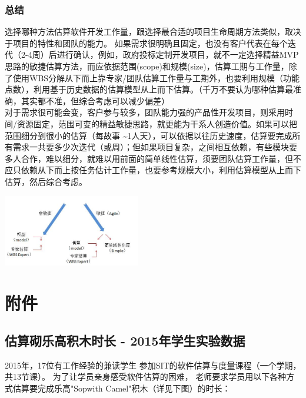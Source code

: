 \hypertarget{ux603bux7ed3}{%
\subsubsection{总结}\label{ux603bux7ed3}}

选择哪种方法估算软件开发工作量，跟选择最合适的项目生命周期方法类似，取决于项目的特性和团队的能力。 如果需求很明确且固定，也没有客户代表在每个迭代（2-4周）后进行确认，例如，政府投标定制开发项目，就不一定选择精益MVP思路的敏捷估算方法，而应依据范围(scope)和规模(size)，估算工期与工作量，除了使用WBS分解从下而上靠专家/团队估算工作量与工期外，也要利用规模（功能点数），利用基于历史数据的估算模型从上而下估算。（千万不要认为哪种估算最准确，其实都不准，但综合考虑可以减少偏差）\\
对于需求很可能会变，客户参与较多，团队能力强的产品性开发项目，则采用时间/资源固定，范围可变的精益敏捷思路，就更能为干系人创造价值。如果可以把范围细分到很小的估算（每故事
\textasciitilde{}1人天），可以依据以往历史速度，估算要完成所有需求一共要多少次迭代（或周）；但如果项目复杂，之间相互依赖，有些模块要多人合作，难以细分，就难以用前面的简单线性估算，须要团队估算工作量，但不应只依赖从下而上按任务估计工作量，也要参考规模大小，利用估算模型从上而下估算，然后综合考虑。


\includegraphics[width=6cm]{敏捷非敏捷1.jpg}\\

\hypertarget{ux9644ux4ef6}{%
\section{附件}\label{ux9644ux4ef6}}

\hypertarget{ux4f30ux7b97ux780cux4e50ux9ad8ux79efux6728ux65f6ux957f---2015ux5e74ux5b66ux751fux5b9eux9a8cux6570ux636e}{%
\subsection{估算砌乐高积木时长 -
2015年学生实验数据}\label{ux4f30ux7b97ux780cux4e50ux9ad8ux79efux6728ux65f6ux957f---2015ux5e74ux5b66ux751fux5b9eux9a8cux6570ux636e}}

2015年，17位有工作经验的兼读学生
参加SIT的软件估算与度量课程（一个学期，共13节课）。
为了让学员亲身感受软件估算的困难，
老师要求学员用以下各种方式估算要完成乐高"Sopwith
Camel"积木（详见下图）的时长：

